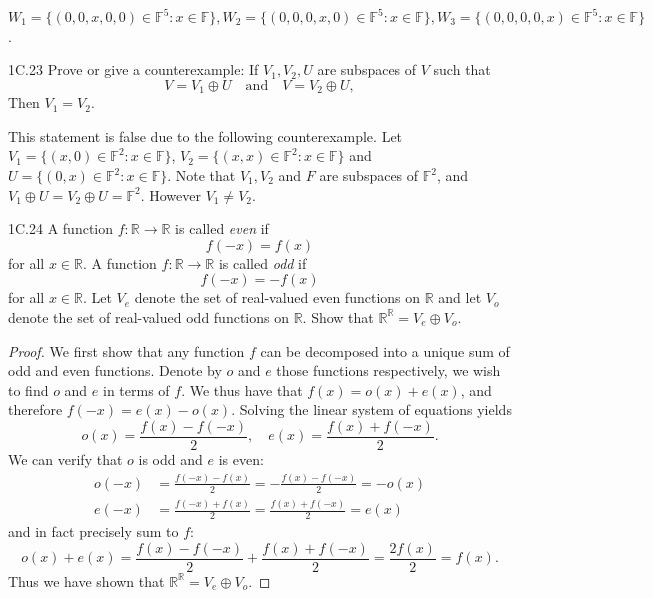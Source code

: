 \documentclass{exam}
\begin{document}
$W_1 = \{(0, 0, x, 0, 0)\in\mathbb F^5:x\in\mathbb F\}, W_2 = \{(0, 0, 0, x, 0)\in\mathbb F^5:x\in\mathbb F\}, W_3 = \{(0, 0, 0, 0, x)\in\mathbb F^5:x\in\mathbb F\}$.

\begin{problem}{1C.23}
    Prove or give a counterexample: If $V_1, V_2, U$ are subspaces of $V$ such that \[
        V = V_1\oplus U\quad\text{and}\quad V= V_2\oplus U,
    \]
    Then $V_1 = V_2$.
\end{problem}

This statement is false due to the following counterexample. Let $V_1 = \{(x, 0)\in\mathbb F^2:x\in\mathbb F\}$, $V_2 = \{(x, x)\in\mathbb F^2: x\in\mathbb F\}$ and $U = \{(0, x)\in\mathbb F^2:x\in\mathbb F\}$. Note that $V_1, V_2$ and $F$ are subspaces of $\mathbb F^2$, and $V_1\oplus U = V_2\oplus U = \mathbb F^2$. However $V_1\neq V_2$.

\begin{problem}{1C.24}
    A function $f:\mathbb R\to\mathbb R$ is called \textit{even} if $$f(-x) = f(x)$$ for all $x\in\mathbb R$. A function $f:\mathbb R\to\mathbb R$ is called \textit{odd} if $$f(-x) = -f(x)$$ for all $x\in\mathbb R$. Let $V_e$ denote the set of real-valued even functions on $\mathbb R$ and let $V_o$ denote the set of real-valued odd functions on $\mathbb R$. Show that $\mathbb R^{\mathbb R} = V_e\oplus V_o$.
\end{problem}

\begin{proof}
    We first show that any function $f$ can be decomposed into a unique sum of odd and even functions. Denote by $o$ and $e$ those functions respectively, we wish to find $o$ and $e$ in terms of $f$. We thus have that $f(x) = o(x) + e(x)$, and therefore $f(-x) = e(x) - o(x)$. Solving the linear system of equations yields \[
        o(x) = \frac{f(x) - f(-x)}2,\quad e(x) = \frac{f(x) + f(-x)}2.
    \]
    We can verify that $o$ is odd and $e$ is even: 
    \begin{align*}    
        o(-x) &= \frac{f(-x) - f(x)}2 = -\frac{f(x) - f(-x)}2 = -o(x)\\
        e(-x) &= \frac{f(-x) + f(x)}2 = \frac{f(x) + f(-x)}2 = e(x)
    \end{align*}
    and in fact precisely sum to $f$: \[
        o(x) + e(x) = \frac{f(x) - f(-x)}2 + \frac{f(x) + f(-x)}2 = \frac{2f(x)}2 = f(x).
    \]
    Thus we have shown that $\mathbb R^{\mathbb R} = V_e\oplus V_o$.
\end{proof}
\end{document}

